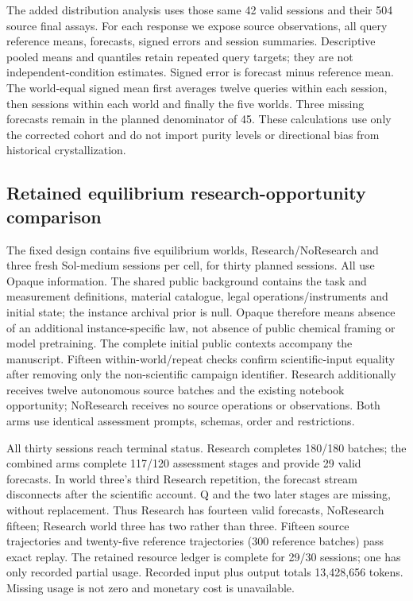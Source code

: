 \documentclass[12pt,a4paper]{article}
\begin{document}
The added distribution analysis uses those same 42 valid sessions and their 504 source final assays. For each response we expose source observations, all query reference means, forecasts, signed errors and session summaries. Descriptive pooled means and quantiles retain repeated query targets; they are not independent-condition estimates. Signed error is forecast minus reference mean. The world-equal signed mean first averages twelve queries within each session, then sessions within each world and finally the five worlds. Three missing forecasts remain in the planned denominator of 45. These calculations use only the corrected cohort and do not import purity levels or directional bias from historical crystallization.

\subsection{Retained equilibrium research-opportunity comparison}\label{retained-equilibrium-research-opportunity-comparison}

The fixed design contains five equilibrium worlds, Research/NoResearch and three fresh Sol-medium sessions per cell, for thirty planned sessions. All use Opaque information. The shared public background contains the task and measurement definitions, material catalogue, legal operations/instruments and initial state; the instance archival prior is null. Opaque therefore means absence of an additional instance-specific law, not absence of public chemical framing or model pretraining. The complete initial public contexts accompany the manuscript. Fifteen within-world/repeat checks confirm scientific-input equality after removing only the non-scientific campaign identifier. Research additionally receives twelve autonomous source batches and the existing notebook opportunity; NoResearch receives no source operations or observations. Both arms use identical assessment prompts, schemas, order and restrictions.

All thirty sessions reach terminal status. Research completes 180/180 batches; the combined arms complete 117/120 assessment stages and provide 29 valid forecasts. In world three's third Research repetition, the forecast stream disconnects after the scientific account. Q and the two later stages are missing, without replacement. Thus Research has fourteen valid forecasts, NoResearch fifteen; Research world three has two rather than three. Fifteen source trajectories and twenty-five reference trajectories (300 reference batches) pass exact replay. The retained resource ledger is complete for 29/30 sessions; one has only recorded partial usage. Recorded input plus output totals 13,428,656 tokens. Missing usage is not zero and monetary cost is unavailable.
\end{document}
